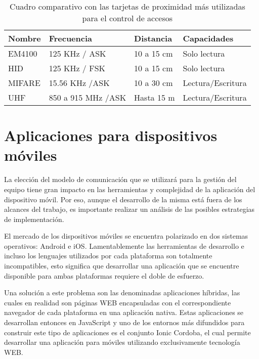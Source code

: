 \begin{table}[ht]
	\centering
	\caption[Tarjetas de proximidad más utilizadas en el control de accesos]{Cuadro comparativo con las tarjetas de proximidad más utilizadas para el control de accesos}
	\begin{tabular}{C{15mm} C{40mm} C{25mm} C{35mm}}
		\toprule
		\textbf{Nombre} 	
			& \textbf{Frecuencia}
			& \textbf{Distancia}	
			& \textbf{Capacidades}
			\\
		\midrule
			EM4100 			
			& 125 KHz / ASK
			& 10 a 15 cm	
			& Solo lectura
			\\
			HID 			
			& 125 KHz / FSK
			& 10 a 15 cm	
			& Solo lectura
			\\
			MIFARE 			
			& 15.56 KHz /ASK
			& 10 a 30 cm	
			& Lectura/Escritura
			\\
			UHF 			
			& 850 a 915 MHz /ASK
			& Hasta 15 m	
			& Lectura/Escritura
			\\
		\bottomrule
		\hline
	\end{tabular}
	\label{tab:TarjetasUsadas}
\end{table}

\section{Aplicaciones para dispositivos móviles}
\label{sec:AplicacionesMoviles}
La elección del modelo de comunicación que se utilizará para la gestión del equipo tiene gran impacto en las herramientas y complejidad de la aplicación del dispositivo móvil. Por eso, aunque el desarrollo de la misma está fuera de los alcances del trabajo, es importante realizar un análisis de las posibles estrategias de implementación.

El mercado de los dispositivos móviles se encuentra polarizado en dos sistemas operativos: Android e iOS. Lamentablemente las herramientas de desarrollo e incluso los lenguajes utilizados por cada plataforma son totalmente incompatibles, esto significa que desarrollar una aplicación que se encuentre disponible para ambas plataformas requiere el doble de esfuerzo. 

Una solución a este problema son las denominadas aplicaciones híbridas\cite{profile_software_services_sl_aplicaciones_nodate}, las cuales en realidad son páginas WEB encapsuladas con el correspondiente navegador de cada plataforma en una aplicación nativa\cite{Frameworks}. Estas aplicaciones se desarrollan entonces en JavaScript y uno de los entornos más difundidos para construir este tipo de aplicaciones es el conjunto Ionic Cordoba\cite{ionic_about_nodate}, el cual permite desarrollar una aplicación para móviles utilizando exclusivamente tecnología WEB. 

